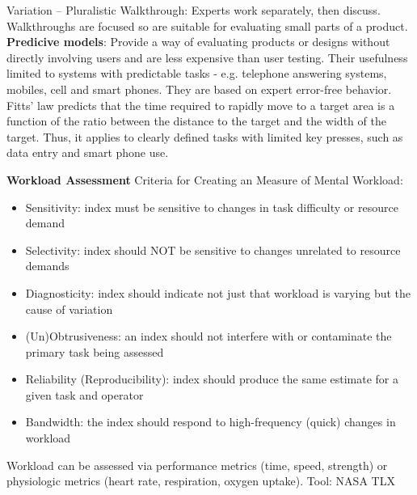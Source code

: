 Variation -- Pluralistic Walkthrough: Experts work separately, then discuss. Walkthroughs are focused so are suitable for evaluating small parts of a product. \\

\textbf{Predicive models}:
Provide a way of evaluating products or designs without directly involving users and are less expensive than user testing. Their usefulness limited to systems with predictable
tasks - e.g. telephone answering systems, mobiles, cell and smart phones. They are based on expert error-free behavior. Fitts' law predicts that the time required to rapidly move to a target area is a function of the ratio between the distance to the target and the width of the target. Thus, it applies to clearly defined tasks with limited key presses, such as data entry and smart phone use.

\textbf{Workload Assessment}
Criteria for Creating an Measure of Mental Workload:
\begin{itemize}
\item Sensitivity: index must be sensitive to changes in task difficulty or resource demand
\item Selectivity: index should NOT be sensitive to changes unrelated to resource demands
\item Diagnosticity: index should indicate not just that workload is varying but the cause of variation
\item (Un)Obtrusiveness: an index should not interfere with or contaminate the primary task being assessed
\item Reliability (Reproducibility): index should produce the same estimate for a given task and operator
\item Bandwidth: the index should respond to high-frequency (quick) changes in workload
\end{itemize}
Workload can be assessed via performance metrics (time, speed, strength) or physiologic metrics (heart rate, respiration, oxygen uptake). 
Tool: NASA TLX